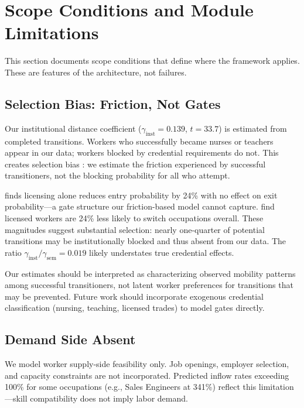 \documentclass[12pt]{article}
\begin{document}
\section{Scope Conditions and Module Limitations}
\label{sec:limitations}


This section documents scope conditions that define where the framework applies. These are features of the architecture, not failures.


\subsection{Selection Bias: Friction, Not Gates}
\label{subsec:limitation-friction}


Our institutional distance coefficient ($\gamma_{\mathrm{inst}} = 0.139$, $t = 33.7$) is estimated from completed transitions. Workers who successfully became nurses or teachers appear in our data; workers blocked by credential requirements do not. This creates selection bias \citep{Heckman1979}: we estimate the friction experienced by successful transitioners, not the blocking probability for all who attempt.

\citet{Jackson2023} finds licensing alone reduces entry probability by 24\% with no effect on exit probability---a gate structure our friction-based model cannot capture. \citet{KleinerXu2020} find licensed workers are 24\% less likely to switch occupations overall. These magnitudes suggest substantial selection: nearly one-quarter of potential transitions may be institutionally blocked and thus absent from our data. The ratio $\gamma_{\mathrm{inst}}/\gamma_{\mathrm{sem}} = 0.019$ likely understates true credential effects.

Our estimates should be interpreted as characterizing observed mobility patterns among successful transitioners, not latent worker preferences for transitions that may be prevented. Future work should incorporate exogenous credential classification (nursing, teaching, licensed trades) to model gates directly.


\subsection{Demand Side Absent}
\label{subsec:limitation-demand}


We model worker supply-side feasibility only. Job openings, employer selection, and capacity constraints are not incorporated. Predicted inflow rates exceeding 100\% for some occupations (e.g., Sales Engineers at 341\%) reflect this limitation---skill compatibility does not imply labor demand.
\end{document}
